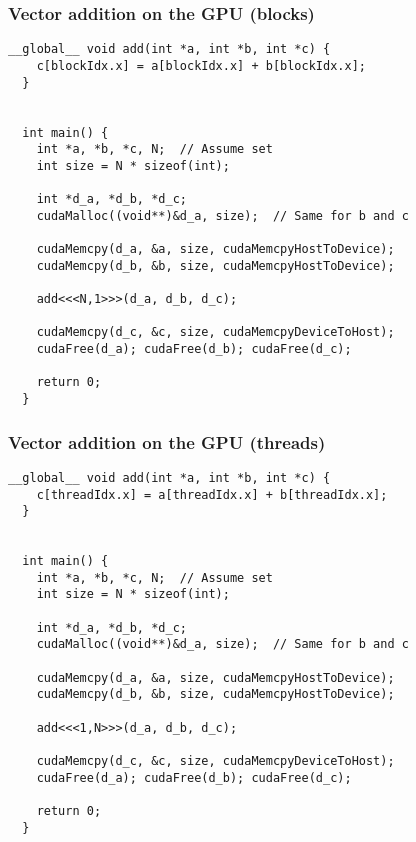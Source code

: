 \begin{frame}[fragile]
  \frametitle{Vector addition on the GPU (blocks)}
  \begin{lstlisting}[style=cuda, basicstyle=\ttfamily\scriptsize]
  __global__ void add(int *a, int *b, int *c) {
    c[blockIdx.x] = a[blockIdx.x] + b[blockIdx.x];
  }


  int main() {
    int *a, *b, *c, N;  // Assume set
    int size = N * sizeof(int);

    int *d_a, *d_b, *d_c;
    cudaMalloc((void**)&d_a, size);  // Same for b and c

    cudaMemcpy(d_a, &a, size, cudaMemcpyHostToDevice);
    cudaMemcpy(d_b, &b, size, cudaMemcpyHostToDevice);

    add<<<N,1>>>(d_a, d_b, d_c);

    cudaMemcpy(d_c, &c, size, cudaMemcpyDeviceToHost);
    cudaFree(d_a); cudaFree(d_b); cudaFree(d_c);

    return 0;
  }
  \end{lstlisting}
\end{frame}

\begin{frame}[fragile]
  \frametitle{Vector addition on the GPU (threads)}
  \begin{lstlisting}[style=cuda, basicstyle=\ttfamily\scriptsize]
  __global__ void add(int *a, int *b, int *c) {
    c[threadIdx.x] = a[threadIdx.x] + b[threadIdx.x];
  }


  int main() {
    int *a, *b, *c, N;  // Assume set
    int size = N * sizeof(int);

    int *d_a, *d_b, *d_c;
    cudaMalloc((void**)&d_a, size);  // Same for b and c

    cudaMemcpy(d_a, &a, size, cudaMemcpyHostToDevice);
    cudaMemcpy(d_b, &b, size, cudaMemcpyHostToDevice);

    add<<<1,N>>>(d_a, d_b, d_c);

    cudaMemcpy(d_c, &c, size, cudaMemcpyDeviceToHost);
    cudaFree(d_a); cudaFree(d_b); cudaFree(d_c);

    return 0;
  }
  \end{lstlisting}
\end{frame}

